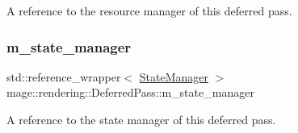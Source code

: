 A reference to the resource manager of this deferred pass. \hypertarget{classmage_1_1rendering_1_1_deferred_pass_aaeabb408d0454f13fdabad2a8e668f61}{}\label{classmage_1_1rendering_1_1_deferred_pass_aaeabb408d0454f13fdabad2a8e668f61} 
\subsubsection{\texorpdfstring{m\+\_\+state\+\_\+manager}{m\_state\_manager}}
{\footnotesize\ttfamily std\+::reference\+\_\+wrapper$<$ \hyperlink{classmage_1_1rendering_1_1_state_manager}{State\+Manager} $>$ mage\+::rendering\+::\+Deferred\+Pass\+::m\+\_\+state\+\_\+manager\hspace{0.3cm}{\ttfamily [private]}}

A reference to the state manager of this deferred pass. 